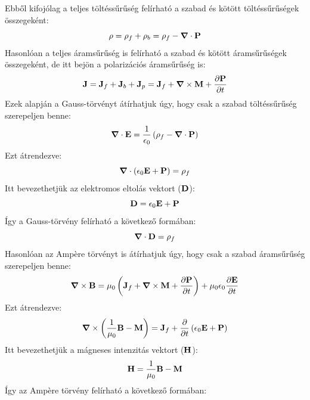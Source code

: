 \documentclass[a4paper,12pt]{article}
\begin{document}
Ebből kifojólag a teljes töltéssűrűség felírható a szabad és kötött töltéssűrűségek összegeként:
\begin{equation}
    \rho = \rho_f + \rho_b = \rho_f - \boldsymbol{\nabla} \cdot \bold{P}
\end{equation}
Hasonlóan a teljes áramsűrűség is felírható a szabad és kötött áramsűrűségek összegeként, de itt bejön a polarizációs áramsűrűség is:
\begin{equation}
    \bold{J} = \bold{J}_f + \bold{J}_b + \bold{J}_p = \bold{J}_f + \boldsymbol{\nabla} \times \bold{M} + \frac{\partial \bold{P}}{\partial t}
\end{equation}
Ezek alapján a Gauss-törvényt átírhatjuk úgy, hogy csak a szabad töltéssűrűség szerepeljen benne:
\begin{equation}
    \boldsymbol{\nabla} \cdot \bold{E} = \frac{1}{\epsilon_0} \left( \rho_f - \boldsymbol{\nabla} \cdot \bold{P} \right)
\end{equation}
Ezt átrendezve:
\begin{equation}
    \boldsymbol{\nabla} \cdot \left( \epsilon_0 \bold{E} + \bold{P} \right) = \rho_f
\end{equation}
Itt bevezethetjük az elektromos eltolás vektort ($\bold{D}$):
\begin{equation}
    \bold{D} = \epsilon_0 \bold{E} + \bold{P}
\end{equation}
Így a Gauss-törvény felírható a következő formában:
\begin{equation}
    \boldsymbol{\nabla} \cdot \bold{D} = \rho_f
\end{equation}
Hasonlóan az Ampère törvényt is átírhatjuk úgy, hogy csak a szabad áramsűrűség szerepeljen benne:
\begin{equation}
    \boldsymbol{\nabla} \times \bold{B} = \mu_0 \left( \bold{J}_f + \boldsymbol{\nabla} \times \bold{M} + \frac{\partial \bold{P}}{\partial t} \right) + \mu_0 \epsilon_0 \frac{\partial \bold{E}}{\partial t}
\end{equation}
Ezt átrendezve:
\begin{equation}
    \boldsymbol{\nabla} \times \left( \frac{1}{\mu_0} \bold{B} - \bold{M} \right) = \bold{J}_f + \frac{\partial }{\partial t} \left( \epsilon_0 \bold{E} + \bold{P} \right)
\end{equation}
Itt bevezethetjük a mágneses intenzitás vektort ($\bold{H}$):
\begin{equation}
    \bold{H} = \frac{1}{\mu_0} \bold{B} - \bold{M}
\end{equation}
Így az Ampère törvény felírható a következő formában:
\end{document}
